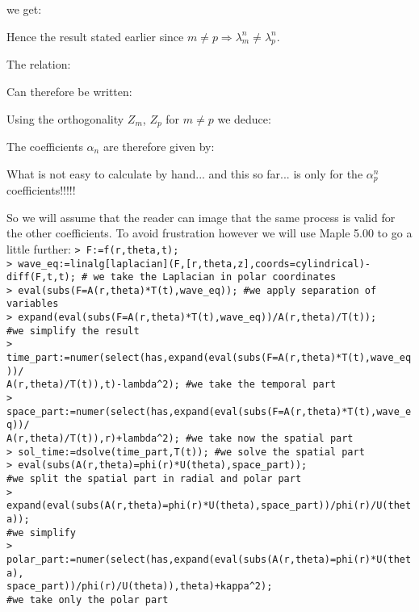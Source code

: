 	we get:
	
	Hence the result stated earlier since $m\neq p\Rightarrow \lambda_m^n\neq \lambda_p^n$.
	
	The relation:
	
	Can therefore be written:
	
	Using the orthogonality $Z_m$, $Z_p$ for $m\neq p$ we deduce:
	
	The coefficients $\alpha_n$ are therefore given by:
	
	What is not easy to calculate by hand... and this so far... is only for the $\alpha_p^n$ coefficients!!!!!
	
	So we will assume that the reader can image that the same process is valid for the other coefficients. To avoid frustration however we will use Maple 5.00 to go a little further:
	\pagebreak
	\texttt{> F:=f(r,theta,t);\\
	> wave\_eq:=linalg[laplacian](F,[r,theta,z],coords=cylindrical)-diff(F,t,t); \# we take the Laplacian in polar coordinates\\
	> eval(subs(F=A(r,theta)*T(t),wave\_eq)); \#we apply separation of variables\\
	> expand(eval(subs(F=A(r,theta)*T(t),wave\_eq))/A(r,theta)/T(t)); \\ \#we simplify the result\\
	> time\_part:=numer(select(has,expand(eval(subs(F=A(r,theta)*T(t),wave\_eq))/\\A(r,theta)/T(t)),t)-lambda\string^2); \#we take the temporal part\\
	> space\_part:=numer(select(has,expand(eval(subs(F=A(r,theta)*T(t),wave\_eq))/\\ A(r,theta)/T(t)),r)+lambda\string^2); \#we take now the spatial part\\
	> sol\_time:=dsolve(time\_part,T(t)); \#we solve the spatial part\\
	> eval(subs(A(r,theta)=phi(r)*U(theta),space\_part));\\ \#we split the spatial part in radial and polar part\\
	> expand(eval(subs(A(r,theta)=phi(r)*U(theta),space\_part))/phi(r)/U(theta));\\ \#we simplify\\
	> polar\_part:=numer(select(has,expand(eval(subs(A(r,theta)=phi(r)*U(theta),\\
	space\_part))/phi(r)/U(theta)),theta)+kappa\string^2);\\
	\#we take only the polar part\\
}
